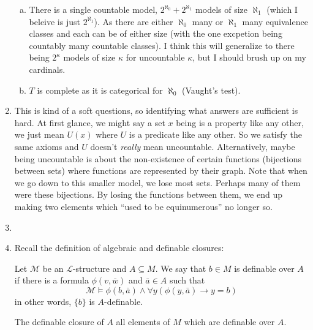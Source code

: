 \documentclass[10pt]{article}
\newcommand{\A}{\forall}
\newcommand{\mcM}{\mathcal{M}}
\newcommand{\mcN}{\mathcal{N}}
\newcommand{\mcL}{\mathcal{L}}
\newcommand{\E}{\exists}
\newcommand{\eldiag}{\text{Diag}_\text{el}}
\begin{document}
\begin{enumerate}[1.]
\begin{enumerate}[a)]
  \item There is a single countable model, \(2^{\aleph_0} + 2^{\aleph_1}\) models of size \(\aleph_1\) (which I beleive is just \(2^{\aleph_1}\)). As there are either \(\aleph_0\) many or \(\aleph_1\) many equivalence classes and each can be of either size (with the one excpetion being countably many countable classes). I think this will generalize to there being \(2^\kappa\) models of size \(\kappa\) for uncountable \(\kappa\), but I should brush up on my cardinals.  
 
  \item \(T\) is complete as it is categorical for \(\aleph_0\) (Vaught's test).
\end{enumerate}

\item This is kind of a soft questions, so identifying what answers are sufficient is hard. At first glance, we might say a set \(x\) being is a property like any other, we just mean \(U(x)\) where \(U\) is a predicate like any other. So we satisfy the same axioms and \(U\) doesn't \textit{really} mean uncountable. Alternatively, maybe being uncountable is about the non-existence of certain functions (bijections between sets) where functions are represented by their graph.  Note that when we go down to this smaller model, we lose most sets. Perhaps many of them were these bijections. By losing the functions between them, we end up making two elements which ``used to be equinumerous'' no longer so. 
 
\item %

\item 
Recall the definition of algebraic and definable closures:

Let \(\mcM\) be an \(\mcL\)-structure and \(A \subseteq M\). 
We say that \(b \in M\) is definable over \(A\) if there is a formula \(\phi(v, \bar{w})\) and \(\bar{a} \in A\) such that
\[\mcM \models \phi(b, \bar{a}) \land \A y (\phi(y, \bar{a}) \to y = b)\]
in other words, \(\{b\}\) is \(A\)-definable. 

The definable closure of \(A\) all elements of \(M\) which are definable over \(A\).


\end{enumerate}
\end{document}
